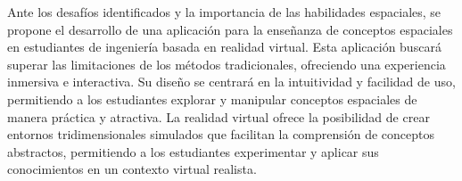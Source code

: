 Ante los desafíos identificados y la importancia de las habilidades espaciales, se propone el desarrollo de una aplicación para la enseñanza de conceptos espaciales en estudiantes de ingeniería basada en realidad virtual. Esta aplicación buscará superar las limitaciones de los métodos tradicionales, ofreciendo una experiencia inmersiva e interactiva. Su diseño se centrará en la intuitividad y facilidad de uso, permitiendo a los estudiantes explorar y manipular conceptos espaciales de manera práctica y atractiva. La realidad virtual ofrece la posibilidad de crear entornos tridimensionales simulados que facilitan la comprensión de conceptos abstractos, permitiendo a los estudiantes experimentar y aplicar sus conocimientos en un contexto virtual realista.

\clearpage

